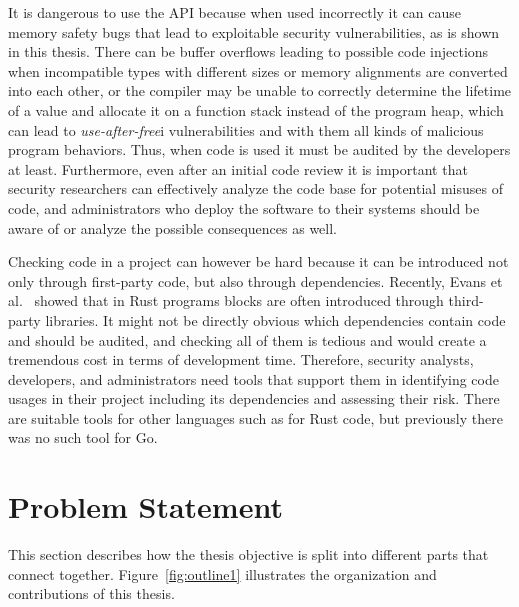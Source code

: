 It is dangerous to use the \unsafe{} \acrshort{API} because when used incorrectly it can cause memory safety bugs that
lead to exploitable security vulnerabilities, as is shown in this thesis.
There can be buffer overflows leading to possible code injections when incompatible types with different sizes or
memory alignments are converted into each other, or the compiler may be unable to correctly determine the lifetime of
a value and allocate it on a function stack instead of the program heap, which can lead to \textit{use-after-free}i
vulnerabilities and with them all kinds of malicious program behaviors.
Thus, when \unsafe{} code is used it must be audited by the developers at least.
Furthermore, even after an initial code review it is important that security researchers can effectively analyze the
code base for potential misuses of \unsafe{} code, and administrators who deploy the software to their systems should
be aware of or analyze the possible consequences as well.

Checking \unsafe{} code in a project can however be hard because it can be introduced not only through first-party
code, but also through dependencies.
Recently, Evans et al.~\cite{evans2020} showed that in Rust programs \unsafe{} blocks are often introduced through
third-party libraries.
It might not be directly obvious which dependencies contain \unsafe{} code and should be audited, and checking all of
them is tedious and would create a tremendous cost in terms of development time.
Therefore, security analysts, developers, and administrators need tools that support them in identifying \unsafe{}
code usages in their project including its dependencies and assessing their risk.
There are suitable tools for other languages such as \toolCargoGeiger{} for Rust code, but previously there was no such
tool for Go.



\section{Problem Statement}\label{sec:introduction:problem-statement}

This section describes how the thesis objective is split into different parts that connect together.
Figure~\ref{fig:outline1} illustrates the organization and contributions of this thesis.



